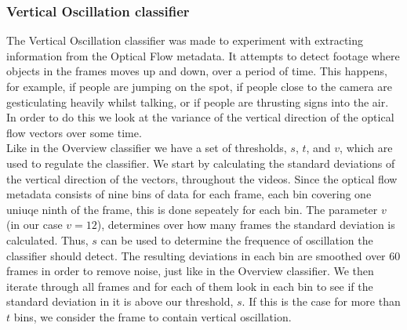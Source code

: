 \subsubsection{Vertical Oscillation classifier}
%
The Vertical Oscillation classifier was made to experiment with extracting information from the Optical Flow metadata. It attempts to detect footage where objects in the frames moves up and down, over a period of time. This happens, for example, if people are jumping on the spot, if people close to the camera are gesticulating heavily whilst talking, or if people are thrusting signs into the air. In order to do this we look at the variance of the vertical direction of the optical flow vectors over some time.\\
Like in the Overview classifier we have a set of thresholds, $s$, $t$, and $v$, which are used to regulate the classifier. We start by calculating the standard deviations of the vertical direction of the vectors, throughout the videos. Since the optical flow metadata consists of nine bins of data for each frame, each bin covering one uniuqe ninth of the frame, this is done sepeately for each bin. The parameter $v$ (in our case $v = 12$), determines over how many frames the standard deviation is calculated. Thus, $s$ can be used to determine the frequence of oscillation the classifier should detect. The resulting deviations in each bin are smoothed over 60 frames in order to remove noise, just like in the Overview classifier. We then iterate through all frames and for each of them look in each bin to see if the standard deviation in it is above our threshold, $s$. If this is the case for more than $t$ bins, we consider the frame to contain vertical oscillation.
%
%
